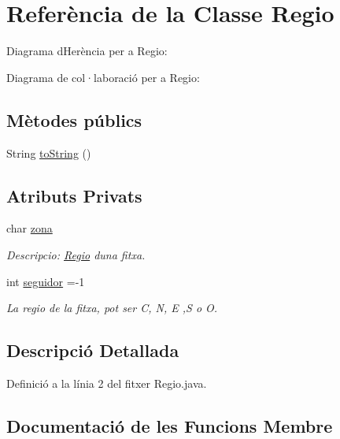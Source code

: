 \hypertarget{class_regio}{}\section{Referència de la Classe Regio}
\label{class_regio}


Diagrama d\textquotesingle{}Herència per a Regio\+:


Diagrama de col·laboració per a Regio\+:
\subsection*{Mètodes públics}
\begin{DoxyCompactItemize}
\item 
String \mbox{\hyperlink{class_regio_ac9eab14f726c0131d292bd07b53615b0}{to\+String}} ()
\end{DoxyCompactItemize}
\subsection*{Atributs Privats}
\begin{DoxyCompactItemize}
\item 
char \mbox{\hyperlink{class_regio_a6127a89be76e0428032433698b959c6b}{zona}}
\begin{DoxyCompactList}\small\item\em Descripcio\+: \mbox{\hyperlink{class_regio}{Regio}} d\textquotesingle{}una fitxa. \end{DoxyCompactList}\item 
int \mbox{\hyperlink{class_regio_a8f06cf427e362e9c5ed9200342656e76}{seguidor}} =-\/1
\begin{DoxyCompactList}\small\item\em La regio de la fitxa, pot ser C, N, E ,S o O. \end{DoxyCompactList}\end{DoxyCompactItemize}


\subsection{Descripció Detallada}


Definició a la línia 2 del fitxer Regio.\+java.



\subsection{Documentació de les Funcions Membre}
\mbox{\label{class_regio_ac9eab14f726c0131d292bd07b53615b0}} 
